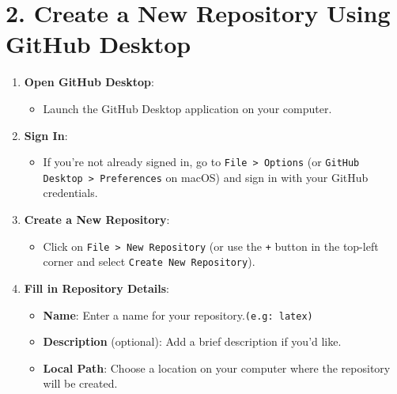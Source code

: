 \documentclass[12pt, a4paper]{article}
\begin{document}
\section*{\textcolor{blue!60}{2. Create a New Repository Using GitHub Desktop}}
\vspace{0.6cm}
\begin{enumerate}
    \item \textbf{Open GitHub Desktop}:
    \begin{itemize}
        \item \textmd{Launch the GitHub Desktop application on your computer}.
    \end{itemize}
\vspace{2cm}
\vspace{-1cm}
    \item \textbf{Sign In}:
    \begin{itemize}
        \item \textmd{If you’re not already signed in, go to \texttt{File > Options} (or \texttt{GitHub Desktop > Preferences} on macOS) and sign in with your GitHub credentials.}
    \end{itemize}
\vspace{0.3cm}
    \item \textbf{Create a New Repository}:
    \begin{itemize}
        \item \textmd{Click on \texttt{File > New Repository} (or use the \texttt{+} button in the top-left corner and select \texttt{Create New Repository}).}
    \end{itemize}
\vspace{0.3cm}  
    \item \textbf{Fill in Repository Details}:
    \begin{itemize}
        \item \textbf{Name}: \textmd{Enter a name for your repository.\texttt{(e.g: latex)}}
        
        \item \textbf{Description} (optional): \textmd{Add a brief description if you’d like.}
        
        \item \textbf{Local Path}: \textmd{Choose a location on your computer where the repository will be created.}
        

\end{itemize}
\end{enumerate}
\end{document}
